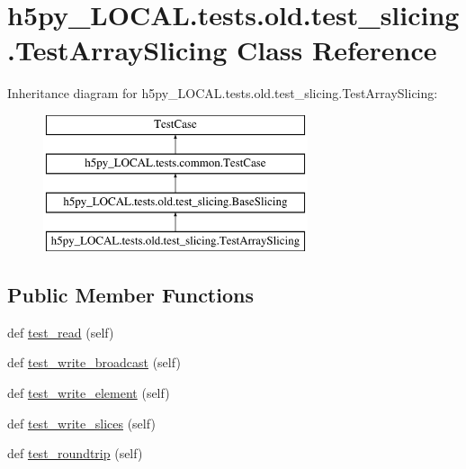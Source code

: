 \hypertarget{classh5py__LOCAL_1_1tests_1_1old_1_1test__slicing_1_1TestArraySlicing}{}\section{h5py\+\_\+\+L\+O\+C\+A\+L.\+tests.\+old.\+test\+\_\+slicing.\+Test\+Array\+Slicing Class Reference}
\label{classh5py__LOCAL_1_1tests_1_1old_1_1test__slicing_1_1TestArraySlicing}
Inheritance diagram for h5py\+\_\+\+L\+O\+C\+A\+L.\+tests.\+old.\+test\+\_\+slicing.\+Test\+Array\+Slicing\+:\begin{figure}[H]
\begin{center}
\leavevmode
\includegraphics[height=4.000000cm]{classh5py__LOCAL_1_1tests_1_1old_1_1test__slicing_1_1TestArraySlicing}
\end{center}
\end{figure}
\subsection*{Public Member Functions}
\begin{DoxyCompactItemize}
\item 
def \hyperlink{classh5py__LOCAL_1_1tests_1_1old_1_1test__slicing_1_1TestArraySlicing_a70d299203f0a771e7faadff211ceccdd}{test\+\_\+read} (self)
\item 
def \hyperlink{classh5py__LOCAL_1_1tests_1_1old_1_1test__slicing_1_1TestArraySlicing_a968668bd9d840a373fad040fc239372e}{test\+\_\+write\+\_\+broadcast} (self)
\item 
def \hyperlink{classh5py__LOCAL_1_1tests_1_1old_1_1test__slicing_1_1TestArraySlicing_ab264e23d6e43dbde9e27d65b3a7b21df}{test\+\_\+write\+\_\+element} (self)
\item 
def \hyperlink{classh5py__LOCAL_1_1tests_1_1old_1_1test__slicing_1_1TestArraySlicing_a2a27429ec792371f42e1a81eecd72018}{test\+\_\+write\+\_\+slices} (self)
\item 
def \hyperlink{classh5py__LOCAL_1_1tests_1_1old_1_1test__slicing_1_1TestArraySlicing_a6fe12d02fa75170471f8f27fa15e7ca2}{test\+\_\+roundtrip} (self)
\end{DoxyCompactItemize}
